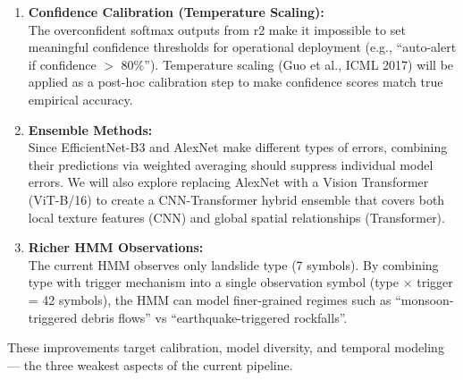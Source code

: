 \documentclass[11pt]{article}
\begin{document}
\begin{enumerate}
    \item \textbf{Confidence Calibration (Temperature Scaling):}\\
          The overconfident softmax outputs from r2 make it impossible to set meaningful confidence thresholds for operational deployment (e.g., ``auto-alert if confidence $>$ 80\%''). Temperature scaling (Guo et al., ICML 2017) will be applied as a post-hoc calibration step to make confidence scores match true empirical accuracy.

    \item \textbf{Ensemble Methods:}\\
          Since EfficientNet-B3 and AlexNet make different types of errors, combining their predictions via weighted averaging should suppress individual model errors. We will also explore replacing AlexNet with a Vision Transformer (ViT-B/16) to create a CNN-Transformer hybrid ensemble that covers both local texture features (CNN) and global spatial relationships (Transformer).

    \item \textbf{Richer HMM Observations:}\\
          The current HMM observes only landslide type (7 symbols). By combining type with trigger mechanism into a single observation symbol (type $\times$ trigger = 42 symbols), the HMM can model finer-grained regimes such as ``monsoon-triggered debris flows'' vs ``earthquake-triggered rockfalls''.
\end{enumerate}

\noindent These improvements target calibration, model diversity, and temporal modeling --- the three weakest aspects of the current pipeline.
\end{document}
